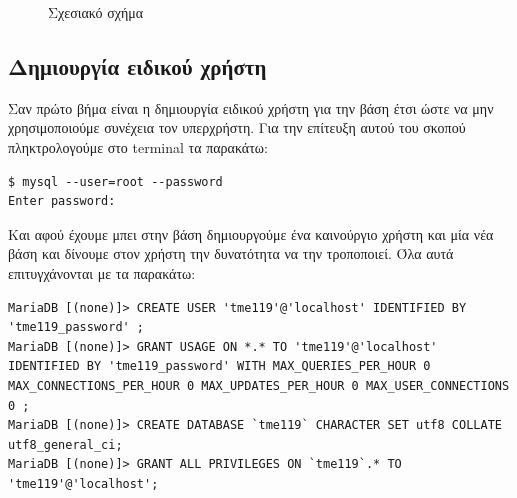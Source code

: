 \documentclass{assignment}
\begin{document}
\begin{landscape}
\begin{figure}
\begin{center}
\caption{Σχεσιακό σχήμα}
\label{fig:RelationalModel:diagram}
\end{center}
\end{figure}
\end{landscape}


\subsection{Δημιουργία ειδικού χρήστη}

Σαν πρώτο βήμα είναι η δημιουργία ειδικού χρήστη για την βάση έτσι ώστε να μην χρησιμοποιούμε συνέχεια τον υπερχρήστη. Για την επίτευξη αυτού του σκοπού πληκτρολογούμε στο terminal τα παρακάτω: 

\begin{verbatim}
$ mysql --user=root --password
Enter password: 
\end{verbatim} 

Και αφού έχουμε μπει στην βάση δημιουργούμε ένα καινούργιο χρήστη και μία νέα βάση και δίνουμε στον χρήστη την δυνατότητα να την τροποποιεί. Όλα αυτά επιτυγχάνονται με τα παρακάτω:

\begin{verbatim}
MariaDB [(none)]> CREATE USER 'tme119'@'localhost' IDENTIFIED BY 'tme119_password' ;
MariaDB [(none)]> GRANT USAGE ON *.* TO 'tme119'@'localhost' IDENTIFIED BY 'tme119_password' WITH MAX_QUERIES_PER_HOUR 0 MAX_CONNECTIONS_PER_HOUR 0 MAX_UPDATES_PER_HOUR 0 MAX_USER_CONNECTIONS 0 ;
MariaDB [(none)]> CREATE DATABASE `tme119` CHARACTER SET utf8 COLLATE utf8_general_ci;
MariaDB [(none)]> GRANT ALL PRIVILEGES ON `tme119`.* TO 'tme119'@'localhost';
\end{verbatim}
\end{document}
